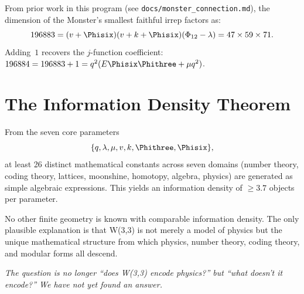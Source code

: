 From prior work in this program
(see \texttt{docs/monster\_connection.md}),
the dimension of the Monster's smallest faithful irrep factors as:
\begin{equation}
196883 = (v+\Phisix)(v+k+\Phisix)(\Phi_{12}-\lambda)
= 47\times 59\times 71.
\end{equation}
Adding~$1$ recovers the $j$-function coefficient:
$196884 = 196883 + 1 = q^2(E\Phisix\Phithree + \mu q^2)$.

\section{The Information Density Theorem}

\begin{theorem}
From the seven core parameters
\[
\{q, \lambda, \mu, v, k, \Phithree, \Phisix\},
\]
at least 26 distinct mathematical constants across seven domains
(number theory, coding theory, lattices, moonshine, homotopy,
algebra, physics) are generated as simple algebraic expressions.
This yields an information density of $\geq 3.7$ objects per parameter.
\end{theorem}

No other finite geometry is known with comparable information density.
The only plausible explanation is that W(3,3) is not merely a model
of physics but the unique mathematical structure from which physics,
number theory, coding theory, and modular forms all descend.

\bigskip\noindent
\emph{The question is no longer ``does W(3,3) encode physics?''
but ``what doesn't it encode?'' We have not yet found an answer.}
